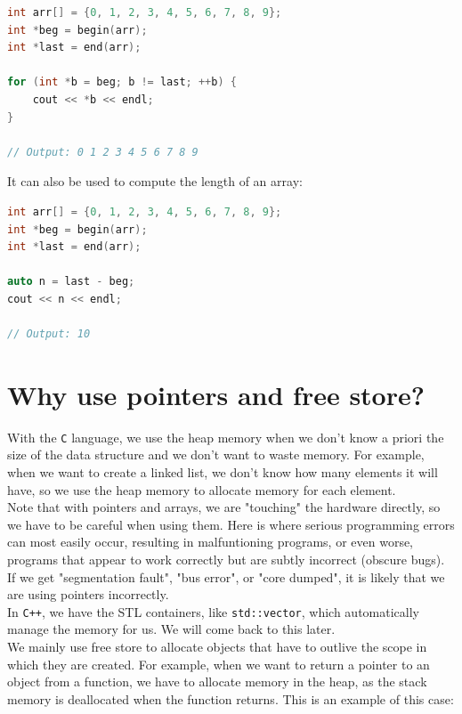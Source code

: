 \begin{lstlisting}[language=C++]
int arr[] = {0, 1, 2, 3, 4, 5, 6, 7, 8, 9};
int *beg = begin(arr);
int *last = end(arr);

for (int *b = beg; b != last; ++b) {
    cout << *b << endl;
}

// Output: 0 1 2 3 4 5 6 7 8 9
\end{lstlisting}

It can also be used to compute the length of an array:\\

\begin{lstlisting}[language=C++]
int arr[] = {0, 1, 2, 3, 4, 5, 6, 7, 8, 9};
int *beg = begin(arr);
int *last = end(arr);

auto n = last - beg;
cout << n << endl;

// Output: 10
\end{lstlisting}

\section{Why use pointers and free store?}

With the \texttt{C} language, we use the heap memory when we don't know a priori the size of the data structure and 
we don't want to waste memory. For example, when we want to create a linked list, we don't know how many elements
it will have, so we use the heap memory to allocate memory for each element.\\

Note that with pointers and arrays, we are "touching" the hardware directly, so we have to be careful when using them.
Here is where serious programming errors can most easily occur, resulting in malfuntioning programs, or even worse,
programs that appear to work correctly but are subtly incorrect (obscure bugs). If we get "segmentation fault",
"bus error", or "core dumped", it is likely that we are using pointers incorrectly.\\

In \texttt{C++}, we have the STL containers, like \texttt{std::vector}, which automatically manage 
the memory for us. We will come back to this later.\\

We mainly use free store to allocate objects that have to outlive the scope in which they are created. For example, when we
want to return a pointer to an object from a function, we have to allocate memory in the heap, as the stack memory is deallocated
when the function returns. This is an example of this case:\\

